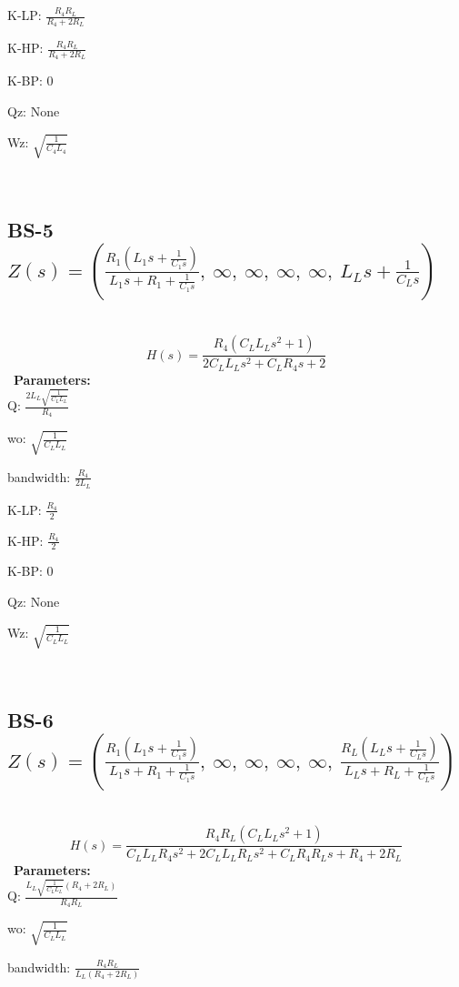 \documentclass{article}
\begin{document}
K-LP: $\frac{R_{4} R_{L}}{R_{4} + 2 R_{L}}$\ 

K-HP: $\frac{R_{4} R_{L}}{R_{4} + 2 R_{L}}$\ 

K-BP: $0$\ 

Qz: $\text{None}$\ 

Wz: $\sqrt{\frac{1}{C_{4} L_{4}}}$\ 

\ 

\subsection{BS-5 $Z(s) = \left( \frac{R_{1} \left(L_{1} s + \frac{1}{C_{1} s}\right)}{L_{1} s + R_{1} + \frac{1}{C_{1} s}}, \  \infty, \  \infty, \  \infty, \  \infty, \  L_{L} s + \frac{1}{C_{L} s}\right)$ } \ 
\textbf{\[H(s) = \frac{R_{4} \left(C_{L} L_{L} s^{2} + 1\right)}{2 C_{L} L_{L} s^{2} + C_{L} R_{4} s + 2}\] } \ 
\textbf{Parameters:}\\ 

Q: $\frac{2 L_{L} \sqrt{\frac{1}{C_{L} L_{L}}}}{R_{4}}$\ 

wo: $\sqrt{\frac{1}{C_{L} L_{L}}}$\ 

bandwidth: $\frac{R_{4}}{2 L_{L}}$\ 

K-LP: $\frac{R_{4}}{2}$\ 

K-HP: $\frac{R_{4}}{2}$\ 

K-BP: $0$\ 

Qz: $\text{None}$\ 

Wz: $\sqrt{\frac{1}{C_{L} L_{L}}}$\ 

\ 

\subsection{BS-6 $Z(s) = \left( \frac{R_{1} \left(L_{1} s + \frac{1}{C_{1} s}\right)}{L_{1} s + R_{1} + \frac{1}{C_{1} s}}, \  \infty, \  \infty, \  \infty, \  \infty, \  \frac{R_{L} \left(L_{L} s + \frac{1}{C_{L} s}\right)}{L_{L} s + R_{L} + \frac{1}{C_{L} s}}\right)$ } \ 
\textbf{\[H(s) = \frac{R_{4} R_{L} \left(C_{L} L_{L} s^{2} + 1\right)}{C_{L} L_{L} R_{4} s^{2} + 2 C_{L} L_{L} R_{L} s^{2} + C_{L} R_{4} R_{L} s + R_{4} + 2 R_{L}}\] } \ 
\textbf{Parameters:}\\ 

Q: $\frac{L_{L} \sqrt{\frac{1}{C_{L} L_{L}}} \left(R_{4} + 2 R_{L}\right)}{R_{4} R_{L}}$\ 

wo: $\sqrt{\frac{1}{C_{L} L_{L}}}$\ 

bandwidth: $\frac{R_{4} R_{L}}{L_{L} \left(R_{4} + 2 R_{L}\right)}$\ 
\end{document}
